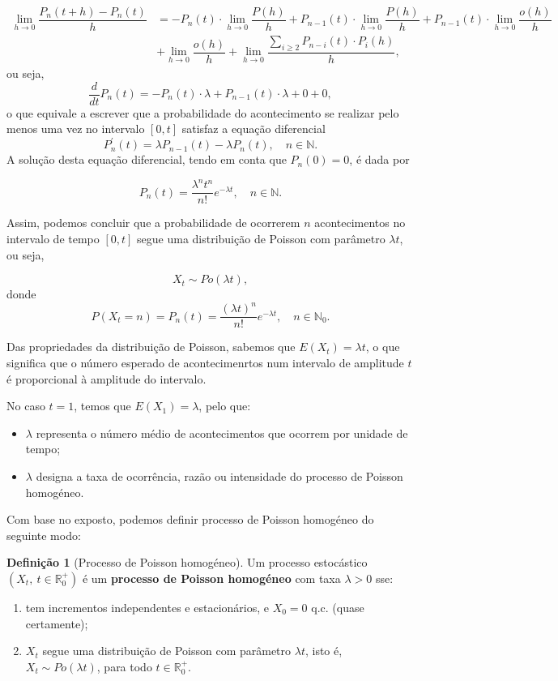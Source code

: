 \documentclass[
  11pt,
  a4paper,
]{book}
\theoremstyle{definition}
\newtheorem{definition}{Definição}[chapter]
\theoremstyle{definition}
\theoremstyle{definition}
\theoremstyle{definition}
\theoremstyle{remark}
\begin{document}
\begin{align*}
\lim\limits_{h \to 0}\dfrac{P_n(t+h)-P_n(t)}{h} &= -P_n(t) \cdot \lim\limits_{h \to 0} \dfrac{P(h)}{h} + P_{n-1}(t) \cdot \lim\limits_{h \to 0} \dfrac{P(h)}{h} + P_{n-1}(t) \cdot \lim\limits_{h \to 0} \dfrac{o(h)}{h} \\
& + \lim\limits_{h \to 0} \dfrac{o(h)}{h}+\lim\limits_{h \to 0} \dfrac{\sum\limits_{i \geq 2}P_{n-i}(t) \cdot P_{i}(h)}{h},
\end{align*}
ou seja,
\[\dfrac{d}{dt}P_n(t)=-P_n(t) \cdot \lambda +  P_{n-1}(t) \cdot \lambda + 0 + 0,\]
o que equivale a escrever que a probabilidade do acontecimento se realizar pelo menos uma vez no intervalo \([0,t]\) satisfaz a equação diferencial
\[\boxed{P^{'}_n(t)=\lambda P_{n-1}(t) - \lambda P_n(t), \quad n \in \mathbb{N}.}\]
A solução desta equação diferencial, tendo em conta que \(P_n(0)=0\), é dada por

\[\boxed{P_n(t)=\dfrac{\lambda^n t^n}{n!} e^{-\lambda t}, \quad n \in \mathbb{N}.}\]

Assim, podemos concluir que a probabilidade de ocorrerem \(n\) acontecimentos no intervalo de tempo \([0,t]\) segue uma distribuição de Poisson com parâmetro \(\lambda t\), ou seja,

\[X_t \sim Po(\lambda t),\]
donde
\[
P(X_t=n)=P_n(t)=\dfrac{(\lambda t)^n}{n!} e^{-\lambda t}, \quad n \in \mathbb{N}_0.
\]

Das propriedades da distribuição de Poisson, sabemos que \(E(X_t)=\lambda t\), o que significa que o número esperado de acontecimenrtos num intervalo de amplitude \(t\) é proporcional à amplitude do intervalo.

No caso \(t=1\), temos que \(E(X_1)=\lambda\), pelo que:

\begin{itemize}
\item
  \(\lambda\) representa o número médio de acontecimentos que ocorrem por unidade de tempo;
\item
  \(\lambda\) designa a taxa de ocorrência, razão ou intensidade do processo de Poisson homogéneo.
\end{itemize}

Com base no exposto, podemos definir processo de Poisson homogéneo do seguinte modo:

\begin{definition}[Processo de Poisson homogéneo]

Um processo estocástico \((X_t, ~ t \in \mathbb{R}_0^+)\) é um \textbf{processo de Poisson homogéneo} com taxa \(\lambda >0\) sse:

\begin{enumerate}
\def\labelenumi{(\roman{enumi})}
\item
  tem incrementos independentes e estacionários, e \(X_0=0\) q.c. (quase certamente);
\item
  \(X_t\) segue uma distribuição de Poisson com parâmetro \(\lambda t\), isto é, \(X_t \sim Po(\lambda t)\), para todo \(t \in \mathbb{R}_0^+\).
\end{enumerate}

\end{definition}
\end{document}
